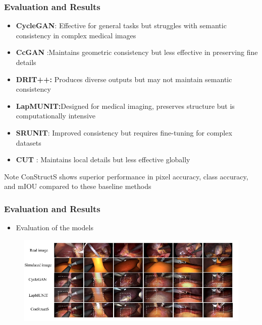 \documentclass[aspectratio=169, lecture, amberg]{OTHAWbeamer}
\begin{document}
\begin{frame}
    \frametitle{Evaluation and Results}
    \begin{itemize}
        \item \textbf{CycleGAN}: Effective for general tasks but struggles with semantic consistency in complex medical images
        \item \textbf{CcGAN} :Maintains geometric consistency but less effective in preserving fine details
        \item  \textbf{DRIT++:} Produces diverse outputs but may not maintain semantic consistency
        \item \textbf{LapMUNIT:}Designed for medical imaging, preserves structure but is computationally intensive
        \item  \textbf{SRUNIT}: Improved consistency but requires fine-tuning for complex datasets
        \item  \textbf{CUT} : Maintains local details but less effective globally
    \end{itemize}
    \begin{block}{Note}
        ConStructS shows superior performance in pixel accuracy, class accuracy, and mIOU compared to these baseline methods
        \end{block}
    
\end{frame}

\begin{frame}
    \frametitle{Evaluation and Results}
    \begin{itemize}
        \item Evaluation of the models
    \end{itemize}
    \begin{figure}
        \centering
        \includegraphics[width=1.0\linewidth]{eval.png} %
        
    \end{figure}
\end{frame}
\end{document}
